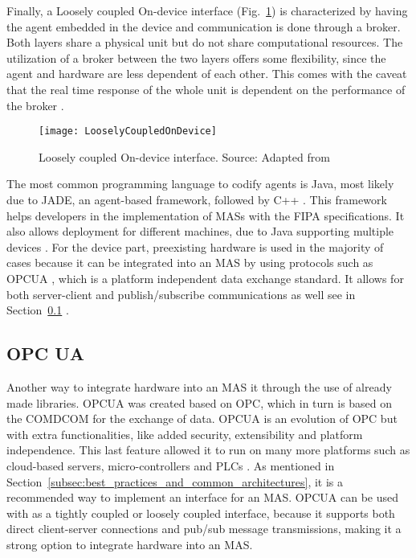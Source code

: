 Finally, a Loosely coupled On-device interface (Fig.~\ref{fig:loosely_coupled_ondevice}) is characterized by having the agent embedded in the device and communication is done through a broker. Both layers share a physical unit but do not share computational resources. The utilization of a broker between the two layers offers some flexibility, since the agent and hardware are less dependent of each other. This comes with the caveat that the real time response of the whole unit is dependent on the performance of the broker \cite{8591641}.\\

\begin{figure}[h!]
	\centering
	\texttt{[image: LooselyCoupledOnDevice]}
	\caption{Loosely coupled On-device interface. Source: Adapted from \cite{8591641}}
	\label{fig:loosely_coupled_ondevice}
\end{figure}

The most common programming language to codify agents is Java, most likely due to JADE, an agent-based framework, followed by C++ \cite{8591641}. This framework helps developers in the implementation of \gls{MAS}s with the \gls{FIPA} specifications. It also allows deployment for different machines, due to Java supporting multiple devices \cite{JADE_website}.
For the device part, preexisting hardware is used in the majority of cases because it can be integrated into an \gls{MAS} by using protocols such as \gls{OPCUA} \cite{8591641}, which is a platform independent data exchange standard. It allows for both server-client and publish/subscribe communications as well see in Section~\ref{subsec:opcua} \cite{OPCUA_website}.

\subsection{OPC UA}
\label{subsec:opcua}



Another way to integrate hardware into an \gls{MAS} it through the use of already made libraries. \gls{OPCUA} was created based on \gls{OPC}, which in turn is based on the \gls{COMDCOM} for the exchange of data. \gls{OPCUA} is an evolution of \gls{OPC} but with extra functionalities, like added security, extensibility and platform independence. This last feature allowed it to run on many more platforms such as cloud-based servers, micro-controllers and \gls{PLC}s \cite{OPCUA_website}. As mentioned in Section~\ref{subsec:best_practices_and_common_architectures}, it is a recommended way to implement an interface for an \gls{MAS}. \gls{OPCUA} can be used with as a tightly coupled or loosely coupled interface, because it supports both direct client-server connections and pub/sub message transmissions, making it a strong option to integrate hardware into an \gls{MAS}.\\

